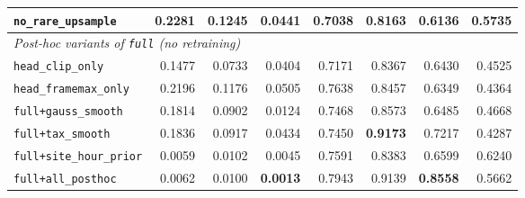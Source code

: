 \begin{table}[H]
\begin{adjustbox}{max width=\linewidth}
\begin{tabular}{lrrrrrrr}
\texttt{no\_rare\_upsample} & 0.2281 & 0.1245 & 0.0441 & 0.7038 & 0.8163 & 0.6136 & 0.5735 \\
\midrule
\multicolumn{8}{l}{\emph{Post-hoc variants of \texttt{full} (no retraining)}} \\
\texttt{head\_clip\_only} & 0.1477 & 0.0733 & 0.0404 & 0.7171 & 0.8367 & 0.6430 & 0.4525 \\
\texttt{head\_framemax\_only} & 0.2196 & 0.1176 & 0.0505 & 0.7638 & 0.8457 & 0.6349 & 0.4364 \\
\texttt{full+gauss\_smooth} & 0.1814 & 0.0902 & 0.0124 & 0.7468 & 0.8573 & 0.6485 & 0.4668 \\
\texttt{full+tax\_smooth} & 0.1836 & 0.0917 & 0.0434 & 0.7450 & \textbf{0.9173} & 0.7217 & 0.4287 \\
\texttt{full+site\_hour\_prior} & 0.0059 & 0.0102 & 0.0045 & 0.7591 & 0.8383 & 0.6599 & 0.6240 \\
\texttt{full+all\_posthoc} & 0.0062 & 0.0100 & \textbf{0.0013} & 0.7943 & 0.9139 & \textbf{0.8558} & 0.5662 \\
\bottomrule
\end{tabular}
\end{adjustbox}
\end{table}
